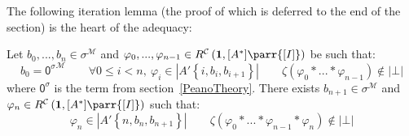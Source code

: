 \documentclass{CSML}
\renewcommand{\ldots}{...}
\newcommand*\SortA{\sigma}
\newcommand*\LogSortedTerm[2]{#1^{#2}}
\newcommand*\LogConst[1]{\mathsf{#1}}
\newcommand*\LogBot\bot
\newcommand*\LogFormA{A}
\newcommand*\LogSubst[1]{\left\{#1\right\}}
\newcommand*\ModM{\mathcal{M}}
\newcommand*\ModElemB{b}
\newcommand*\ModMInterp[1]{{#1}^\ModM}
\newcommand*\LmInterpForm[1]{{#1}^*}
\newcommand*\CatC{\mathcal{C}}
\newcommand*\CatR{R}
\newcommand*\CatRC{\CatExp{\CatR}{\CatC}}
\newcommand*\CatExp[2]{#1^{#2}}
\newcommand*\CatPar\parr
\newcommand*\CatRCHomC\zeta
\newcommand*\CatRCHomE\varphi
\newcommand*\CatTerm{\mathbf{1}}
\newcommand*\CatInterpSort[1]{{\left[#1\right]}}
\newcommand*\RealVal[1]{\left|#1\right|}
\newcommand*\CALogZ{\LogConst{0}}
\newcommand*\CALmnSort{I}
\newcommand*\CALmextend{\mathbin{*}}
\begin{document}
The following iteration lemma (the proof of which is deferred to the end of the section) is the heart of the adequacy:
\begin{lem}
Let $\ModElemB_0,\ldots,\ModElemB_n\in\ModMInterp{\SortA}$ and $\CatRCHomE_0,\ldots,\CatRCHomE_{n-1}\in\CatRC\left(\CatTerm,\CatInterpSort{\LmInterpForm{\LogFormA}}\CatPar\CatInterpSort{\CALmnSort}\right)$ be such that:
$$\ModElemB_0=\ModMInterp{\LogSortedTerm{\CALogZ}{\SortA}}\qquad\forall 0\leq i<n,\ \CatRCHomE_i\in\RealVal{\LogFormA'\LogSubst{i,\ModElemB_i,\ModElemB_{i+1}}}\qquad\CatRCHomC\left(\CatRCHomE_0\CALmextend\ldots\CALmextend\CatRCHomE_{n-1}\right)\notin\RealVal{\LogBot}$$
where $\LogSortedTerm{\CALogZ}{\SortA}$ is the term from section~\ref{PeanoTheory}. There exists $\ModElemB_{n+1}\in\ModMInterp{\SortA}$ and $\CatRCHomE_n\in\CatRC\left(\CatTerm,\CatInterpSort{\LmInterpForm{\LogFormA}}\CatPar\CatInterpSort{\CALmnSort}\right)$ such that:
$$\CatRCHomE_n\in\RealVal{\LogFormA'\LogSubst{n,\ModElemB_n,\ModElemB_{n+1}}}\qquad\CatRCHomC\left(\CatRCHomE_0\CALmextend\ldots\CALmextend\CatRCHomE_{n-1}\CALmextend\CatRCHomE_n\right)\notin\RealVal{\LogBot}$$\smallskip
\end{lem}
\end{document}
